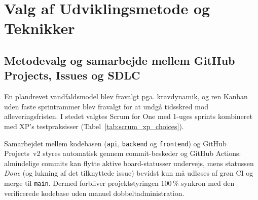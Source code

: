 \documentclass[11pt,a4paper]{article}
\begin{document}
\begin{table}[htbp]
\section{Valg af Udviklingsmetode og Teknikker}

\subsection{Metodevalg og samarbejde mellem GitHub Projects, Issues og SDLC}
En plandrevet vandfaldsmodel blev fravalgt pga. kravdynamik, og ren Kanban uden faste sprintrammer blev fravalgt for at undgå tidsskred mod afleveringsfristen. I stedet valgtes Scrum for One \cite{schwaber2020} med 1-uges sprints kombineret med XP's testpraksisser \cite{beck2004} (Tabel~\ref{tab:scrum_xp_choices}).

Samarbejdet mellem kodebasen (\texttt{api}, \texttt{backend} og \texttt{frontend}) og GitHub Projects~v2 styres automatisk gennem commit-beskeder og GitHub Actions: almindelige commits kan flytte aktive board-statusser undervejs, mens statussen \textit{Done} (og lukning af det tilknyttede issue) bevidst kun må udløses af grøn CI og merge til \texttt{main}. Dermed forbliver projektstyringen 100\,\% synkron med den verificerede kodebase uden manuel dobbeltadministration.


\end{table}
\end{document}
